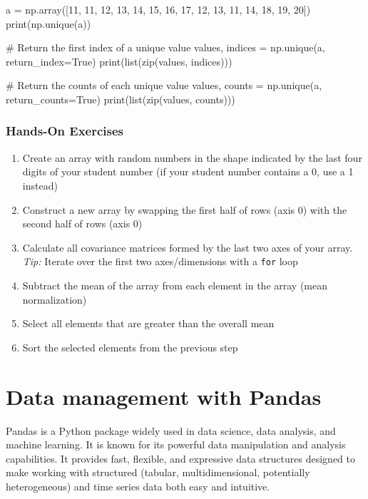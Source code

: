 \begin{samepage}
\begin{pythoncode}
a = np.array([11, 11, 12, 13, 14, 15, 16, 
              17, 12, 13, 11, 14, 18, 19, 20])
print(np.unique(a))

# Return the first index of a unique value
values, indices = np.unique(a, return_index=True)
print(list(zip(values, indices)))

# Return the counts of each unique value
values, counts = np.unique(a, return_counts=True)
print(list(zip(values, counts)))
\end{pythoncode}
\end{samepage}

\begin{tcolorbox}[colback=code]
\subsubsection*{Hands-On Exercises}
\begin{enumerate}
   \item Create an array with random numbers in the shape indicated by the last four digits of your student number (if your student number contains a 0, use a 1 instead)
   \item Construct a new array by swapping the first half of rows (axis 0) with the second half of rows (axis 0)
   \item Calculate all covariance matrices formed by the last two axes of your array. \emph{Tip:} Iterate over the first two axes/dimensions with a \texttt{for} loop
   \item Subtract the mean of the array from each element in the array (mean normalization)
   \item Select all elements that are greater than the overall mean
   \item Sort the selected elements from the previous step
\end{enumerate}
\end{tcolorbox}

\section{Data management with Pandas}

Pandas is a Python package widely used in data science, data analysis, and machine learning. It is known for its powerful data manipulation and analysis capabilities. It provides fast, flexible, and expressive data structures designed to make working with structured (tabular, multidimensional, potentially heterogeneous) and time series data both easy and intuitive. 

